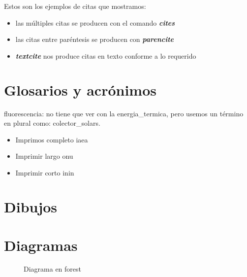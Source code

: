 \documentclass[12pt]{report}
\begin{document}
		Estos son los ejemplos de citas que mostramos: 
		\begin{itemize}
			\item las múltiples citas se producen con el comando \textbf{\textit{cites}} \cites{nadeeshani_nicotinamide_2022}{kalogirou_solar_2004}
			\item las citas entre paréntesis se producen con \textbf{\textit{parencite}} \parencite{kalogirou_solar_2004}
			\item \textbf{\textit{textcite}} nos produce citas en texto conforme a lo requerido
		\end{itemize}
		
		\section{Glosarios y acrónimos}
			\Gls{fluorescencia}: no tiene que ver con la \gls{energia_termica}, pero usemos un término en plural como: \glspl{colector_solar}.
			
			\begin{itemize}
				\item Imprimos completo \acrfull{iaea}
				\item Imprimir largo \acrlong{onu}
				\item Imprimir corto \acrshort{inin}
			\end{itemize}
		
		\section{Dibujos}
			\lipsum[1-2]
			
		
		\section{Diagramas}
			\lipsum[34-36]
			
		\begin{figure}
			\centering
			\caption{Diagrama en forest}
			\label{fig:FirstDiagram}
		\end{figure}
		
			
				
	\printbibliography[heading=bibintoc]
\end{document}
